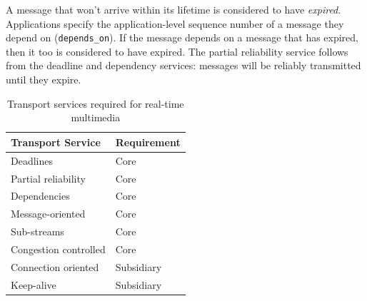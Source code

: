 \documentclass{sig-alternate-05-2015}
\begin{document}
    
A message that won't arrive within its lifetime is considered to have
\emph{expired}. Applications specify the application-level sequence number
of a message they depend on (\texttt{depends\_on}). If the message depends
on a message that has expired, then it too is considered to have expired.
The partial reliability service follows from the deadline and dependency
services: messages will be reliably transmitted until they expire.


\begin{table}
  \centering
  \begin{tabular}{ll}
    \toprule
      Transport Service     & Requirement \\
    \midrule
      Deadlines             & Core        \\
      Partial reliability   & Core        \\
      Dependencies          & Core        \\
      Message-oriented      & Core        \\
      Sub-streams           & Core        \\
      Congestion controlled & Core        \\
      Connection oriented   & Subsidiary  \\
      Keep-alive            & Subsidiary  \\
    \bottomrule
  \end{tabular}
  \caption{Transport services required for real-time multimedia}
  \label{tab:services}
\end{table}
\end{document}
